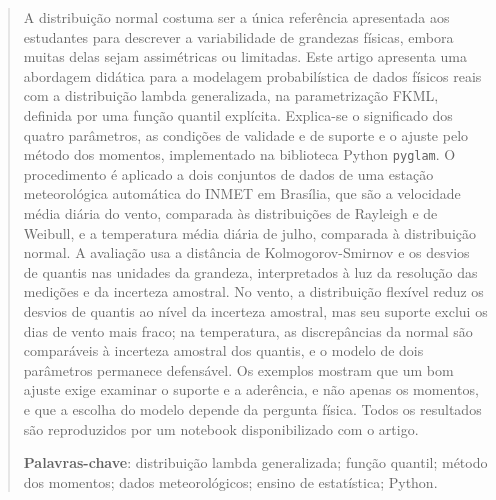 \begin{abstract}
A distribuição normal costuma ser a única referência apresentada aos estudantes para descrever a variabilidade de grandezas físicas, embora muitas delas sejam assimétricas ou limitadas. Este artigo apresenta uma abordagem didática para a modelagem probabilística de dados físicos reais com a distribuição lambda generalizada, na parametrização FKML, definida por uma função quantil explícita. Explica-se o significado dos quatro parâmetros, as condições de validade e de suporte e o ajuste pelo método dos momentos, implementado na biblioteca Python \texttt{pyglam}. O procedimento é aplicado a dois conjuntos de dados de uma estação meteorológica automática do INMET em Brasília, que são a velocidade média diária do vento, comparada às distribuições de Rayleigh e de Weibull, e a temperatura média diária de julho, comparada à distribuição normal. A avaliação usa a distância de Kolmogorov-Smirnov e os desvios de quantis nas unidades da grandeza, interpretados à luz da resolução das medições e da incerteza amostral. No vento, a distribuição flexível reduz os desvios de quantis ao nível da incerteza amostral, mas seu suporte exclui os dias de vento mais fraco; na temperatura, as discrepâncias da normal são comparáveis à incerteza amostral dos quantis, e o modelo de dois parâmetros permanece defensável. Os exemplos mostram que um bom ajuste exige examinar o suporte e a aderência, e não apenas os momentos, e que a escolha do modelo depende da pergunta física. Todos os resultados são reproduzidos por um notebook disponibilizado com o artigo.

\medskip
\noindent\textbf{Palavras-chave}: distribuição lambda generalizada; função quantil; método dos momentos; dados meteorológicos; ensino de estatística; Python.
\end{abstract}


